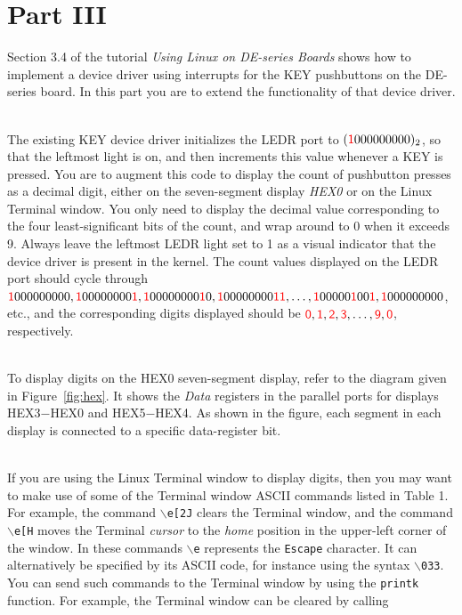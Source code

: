 \documentclass[epsfig,10pt,fullpage]{article}
\begin{document}
\section*{Part III}
\noindent
Section 3.4 of the tutorial \textit{Using Linux on DE-series Boards} shows how to implement a 
device driver using interrupts for the KEY pushbuttons on the DE-series board. In this part you 
are to extend the functionality of that device driver.

~\\
\noindent
The existing KEY device driver initializes the LEDR port to $({\color{red}\sf{1}}000000000)_2$, so that the 
leftmost light is on, and then increments this value whenever a KEY is pressed. You are to 
augment this code to display the count of pushbutton presses as a decimal digit, either on 
the seven-segment display {\it HEX0} or on the Linux Terminal window. You only need to 
display the decimal value corresponding to the four 
least-significant bits of the count, and wrap around to 0 when it exceeds 9. Always
leave the leftmost LEDR light set to 1 as a visual indicator that the device driver 
is present in the kernel. The count values displayed on the LEDR port should cycle through 
${\color{red}\sf{1}}000000000, {\color{red}\sf{1}}00000000{\color{red}\sf{1}}, {\color{red}\sf{1}}00000000{\color{red}\sf{1}}0,
{\color{red}\sf{1}}00000000{\color{red}\sf{11}}, \ldots, {\color{red}\sf{1}}00000{\color{red}\sf{1}}00{\color{red}\sf{1}}, {\color{red}\sf{1}}000000000$, etc., and the 
corresponding digits displayed should be ${\color{red}\sf{0}}, {\color{red}\sf{1}}, {\color{red}\sf{2}}, {\color{red}\sf{3}}, \ldots, {\color{red}\sf{9}},
{\color{red}\sf{0}}$, 
respectively. 

~\\
\noindent
To display digits on the HEX0 seven-segment display, refer to the diagram given in 
Figure~\ref{fig:hex}. It shows the {\it Data} registers in the parallel ports for displays
HEX3$-$HEX0 and HEX5$-$HEX4. As shown in the figure, each segment in each display is
connected to a specific data-register bit. 

~\\
\noindent
If you are using the Linux Terminal window to display digits, then you may want to make 
use of some of the Terminal
window ASCII commands listed in Table 1. For example, the command \texttt{$\backslash$e[2J} clears 
the Terminal window, and the command \texttt{$\backslash$e[H} moves the Terminal {\it cursor} 
to the {\it home} position in the upper-left corner of the window.  In these 
commands \texttt{$\backslash$e} represents the \texttt{Escape} character. It can alternatively 
be specified by its ASCII code, for instance using the syntax \texttt{$\backslash$033}. You can send
such commands to the Terminal window by using the \texttt{printk} function. For example,
the Terminal window can be cleared by calling 
\end{document}
